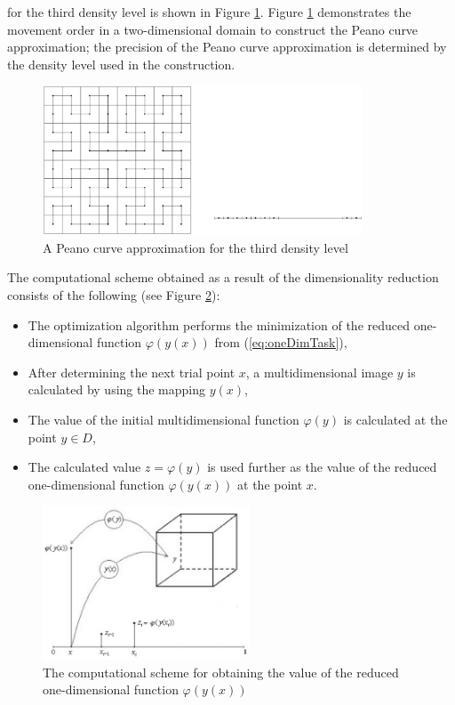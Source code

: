 \documentclass{naco}
\theoremstyle{definition}
\begin{document}
for the third density level is shown in Figure \ref{fig:peanoC}. Figure \ref{fig:peanoC}
demonstrates the movement order in a two-dimensional domain to construct the Peano
curve approximation; the precision of the Peano curve approximation is determined by the
density level used in the construction.
\begin{figure}
    \centering
    \includegraphics[width=0.85\textwidth]{pictures/peanoC.eps}
    \caption{A Peano curve approximation for the third density level}
    \label{fig:peanoC}
\end{figure}

\par
The computational scheme obtained as a result of the dimensionality reduction consists of the following
(see Figure \ref{fig:peanoCUsage}):
\begin{itemize}
  \item The optimization algorithm performs the minimization of the reduced one-dimensional
  function \(\varphi(y(x))\) from (\ref{eq:oneDimTask}),
  \item After determining the next trial point \(x\), a multidimensional image \(y\) is calculated by using the
mapping \(y(x)\),
  \item The value of the initial multidimensional function \(\varphi(y)\) is calculated at the point \(y\in D\),
  \item The calculated value \(z=\varphi(y)\) is used further as the value of the reduced one-dimensional function \(\varphi(y(x))\) at the point \(x\).
\end{itemize}

\begin{figure}
    \centering
    \includegraphics[width=0.55\textwidth]{pictures/peanoCUsage.eps}
    \caption{The computational scheme for obtaining the value of the reduced one-dimensional function \(\varphi(y(x))\)}
    \label{fig:peanoCUsage}
\end{figure}
\end{document}
